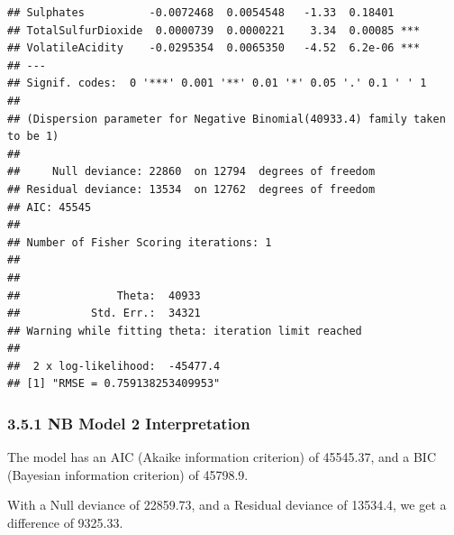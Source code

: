 \documentclass[]{article}
\begin{document}
\begin{verbatim}
## Sulphates          -0.0072468  0.0054548   -1.33  0.18401    
## TotalSulfurDioxide  0.0000739  0.0000221    3.34  0.00085 ***
## VolatileAcidity    -0.0295354  0.0065350   -4.52  6.2e-06 ***
## ---
## Signif. codes:  0 '***' 0.001 '**' 0.01 '*' 0.05 '.' 0.1 ' ' 1
## 
## (Dispersion parameter for Negative Binomial(40933.4) family taken to be 1)
## 
##     Null deviance: 22860  on 12794  degrees of freedom
## Residual deviance: 13534  on 12762  degrees of freedom
## AIC: 45545
## 
## Number of Fisher Scoring iterations: 1
## 
## 
##               Theta:  40933 
##           Std. Err.:  34321 
## Warning while fitting theta: iteration limit reached 
## 
##  2 x log-likelihood:  -45477.4
## [1] "RMSE = 0.759138253409953"
\end{verbatim}

\hypertarget{nb-model-2-interpretation}{%
\subsubsection{3.5.1 NB Model 2
Interpretation}\label{nb-model-2-interpretation}}

The model has an AIC (Akaike information criterion) of 45545.37, and a
BIC (Bayesian information criterion) of 45798.9.

With a Null deviance of 22859.73, and a Residual deviance of 13534.4, we
get a difference of 9325.33.
\end{document}
